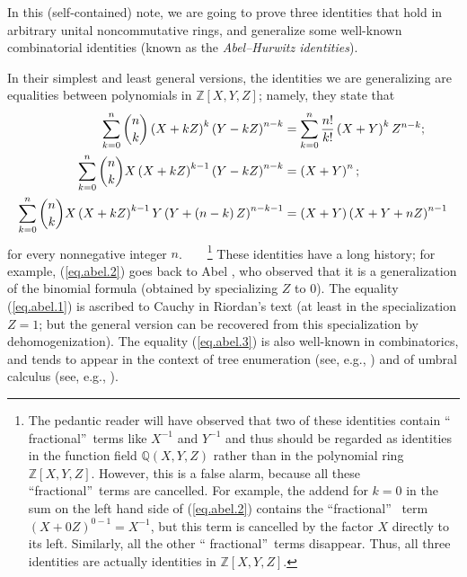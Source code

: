 \documentclass[numbers=enddot,12pt,final,onecolumn,notitlepage]{scrartcl}%
\theoremstyle{definition}
\let\sumnonlimits\sum
\renewcommand{\sum}{\sumnonlimits\limits}
\begin{document}
In this (self-contained) note, we are going to prove three identities that
hold in arbitrary unital noncommutative rings, and generalize some well-known
combinatorial identities (known as the \textit{Abel--Hurwitz identities}).

In their simplest and least general versions, the identities we are
generalizing are equalities between polynomials in $\mathbb{Z}\left[
X,Y,Z\right]  $; namely, they state that
\begin{align}
\sum_{k=0}^{n}\dbinom{n}{k}\left(  X+kZ\right)  ^{k}\left(  Y-kZ\right)
^{n-k}  &  =\sum_{k=0}^{n}\dfrac{n!}{k!}\left(  X+Y\right)  ^{k}%
Z^{n-k};\label{eq.abel.1}\\
\sum_{k=0}^{n}\dbinom{n}{k}X\left(  X+kZ\right)  ^{k-1}\left(  Y-kZ\right)
^{n-k}  &  =\left(  X+Y\right)  ^{n};\label{eq.abel.2}\\
\sum_{k=0}^{n}\dbinom{n}{k}X\left(  X+kZ\right)  ^{k-1}Y\left(  Y+\left(
n-k\right)  Z\right)  ^{n-k-1}  &  =\left(  X+Y\right)  \left(  X+Y+nZ\right)
^{n-1} \label{eq.abel.3}%
\end{align}
for every nonnegative integer $n$.\ \ \ \ \footnote{The pedantic reader will
have observed that two of these identities contain \textquotedblleft
fractional\textquotedblright\ terms like $X^{-1}$ and $Y^{-1}$ and thus should
be regarded as identities in the function field $\mathbb{Q}\left(
X,Y,Z\right)  $ rather than in the polynomial ring $\mathbb{Z}\left[
X,Y,Z\right]  $. However, this is a false alarm, because all these
\textquotedblleft fractional\textquotedblright\ terms are cancelled. For
example, the addend for $k=0$ in the sum on the left hand side of
(\ref{eq.abel.2}) contains the \textquotedblleft fractional\textquotedblright%
\ term $\left(  X+0Z\right)  ^{0-1}=X^{-1}$, but this term is cancelled by the
factor $X$ directly to its left. Similarly, all the other \textquotedblleft
fractional\textquotedblright\ terms disappear. Thus, all three identities are
actually identities in $\mathbb{Z}\left[  X,Y,Z\right]  $.} These identities
have a long history; for example, (\ref{eq.abel.2}) goes back to Abel
\cite{Abel26}, who observed that it is a generalization of the binomial
formula (obtained by specializing $Z$ to $0$). The equality (\ref{eq.abel.1})
is ascribed to Cauchy in Riordan's text \cite[\S 1.5, Cauchy's identity]%
{Riorda68} (at least in the specialization $Z=1$; but the general version can
be recovered from this specialization by dehomogenization). The equality
(\ref{eq.abel.3}) is also well-known in combinatorics, and tends to appear in
the context of tree enumeration (see, e.g., \cite[Theorem 2]{Grinbe17}) and of
umbral calculus (see, e.g., \cite[Section 2.6, Example 3]{Roman84}).
\end{document}
